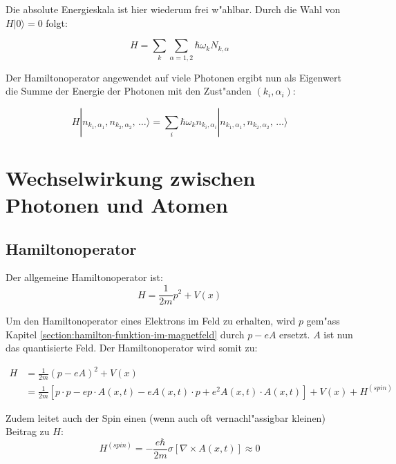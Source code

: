 Die absolute Energieskala ist hier wiederum frei w"ahlbar. Durch die Wahl von $H|0\rangle = 0$ folgt:

\begin{equation*}
H = \sum_k \sum_{\alpha=1,2} \hbar \omega_k N_{k,\alpha}
\end{equation*}

Der Hamiltonoperator angewendet auf viele Photonen ergibt nun als Eigenwert die Summe der Energie der Photonen mit den Zust"anden $(k_i,\alpha_i)$:

\begin{equation*}
H |n_{k_1,\alpha_1}, n_{k_2,\alpha_2}, \, \hdots\rangle = \sum_i \hbar \omega_k n_{k_i,\alpha_i} |n_{k_1,\alpha_1}, n_{k_2,\alpha_2}, \, \hdots\rangle
\end{equation*}

\section{Wechselwirkung zwischen Photonen und Atomen}

\subsection{Hamiltonoperator}

Der allgemeine Hamiltonoperator ist:
\begin{equation*}
H = \frac{1}{2m}p^2 + V(x)
\end{equation*}

Um den Hamiltonoperator eines Elektrons im Feld zu erhalten, wird $p$ gem"ass Kapitel \ref{section:hamilton-funktion-im-magnetfeld} durch $p - eA$ ersetzt. $A$ ist nun das quantisierte Feld. Der Hamiltonoperator wird somit zu:

\begin{equation*}
\begin{split}
H &= \frac{1}{2m}(p - eA)^2 + V(x)\\
 &= \frac{1}{2m}\left[p \cdot p - e p \cdot A(x, t) - e A(x, t) \cdot p + e^2 A(x, t) \cdot A(x, t) \right] + V(x) + H^{(spin)}
\end{split}
\end{equation*}

Zudem leitet auch der Spin einen (wenn auch oft vernachl"assigbar kleinen) Beitrag zu $H$:
\begin{equation*}
H^{(spin)} = - \frac{e \hbar}{2m}\sigma \left[\nabla \times A(x, t)\right] \approx 0
\end{equation*}

